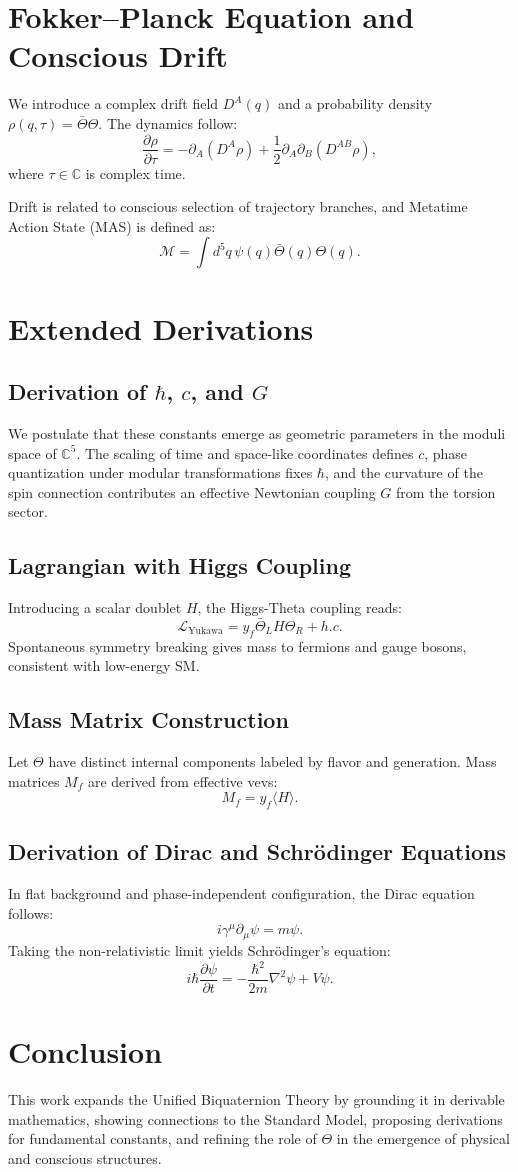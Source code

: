 \documentclass[12pt]{article}
\begin{document}
\section{Fokker--Planck Equation and Conscious Drift}
We introduce a complex drift field \( D^A(q) \) and a probability density \( \rho(q,\tau) = \bar{\Theta} \Theta \). The dynamics follow:
\[ \frac{\partial \rho}{\partial \tau} = -\partial_A ( D^A \rho ) + \frac{1}{2} \partial_A \partial_B (D^{AB} \rho), \]
where \( \tau \in \mathbb{C} \) is complex time.

Drift is related to conscious selection of trajectory branches, and Metatime Action State (MAS) is defined as:
\[ \mathcal{M} = \int d^5q\, \psi(q) \bar{\Theta}(q) \Theta(q). \]

\section{Extended Derivations}

\subsection{Derivation of \( \hbar \), \( c \), and \( G \)}
We postulate that these constants emerge as geometric parameters in the moduli space of \( \mathbb{C}^5 \). The scaling of time and space-like coordinates defines \( c \), phase quantization under modular transformations fixes \( \hbar \), and the curvature of the spin connection contributes an effective Newtonian coupling \( G \) from the torsion sector.

\subsection{Lagrangian with Higgs Coupling}
Introducing a scalar doublet \( H \), the Higgs-Theta coupling reads:
\[
\mathcal{L}_\text{Yukawa} = y_f \bar{\Theta}_L H \Theta_R + h.c.
\]
Spontaneous symmetry breaking gives mass to fermions and gauge bosons, consistent with low-energy SM.

\subsection{Mass Matrix Construction}
Let \( \Theta \) have distinct internal components labeled by flavor and generation. Mass matrices \( M_f \) are derived from effective vevs:
\[
M_f = y_f \langle H \rangle.
\]

\subsection{Derivation of Dirac and Schrödinger Equations}
In flat background and phase-independent configuration, the Dirac equation follows:
\[
i \gamma^\mu \partial_\mu \psi = m \psi.
\]
Taking the non-relativistic limit yields Schrödinger's equation:
\[
i \hbar \frac{\partial \psi}{\partial t} = -\frac{\hbar^2}{2m} \nabla^2 \psi + V \psi.
\]

\section{Conclusion}
This work expands the Unified Biquaternion Theory by grounding it in derivable mathematics, showing connections to the Standard Model, proposing derivations for fundamental constants, and refining the role of \( \Theta \) in the emergence of physical and conscious structures.
\end{document}
